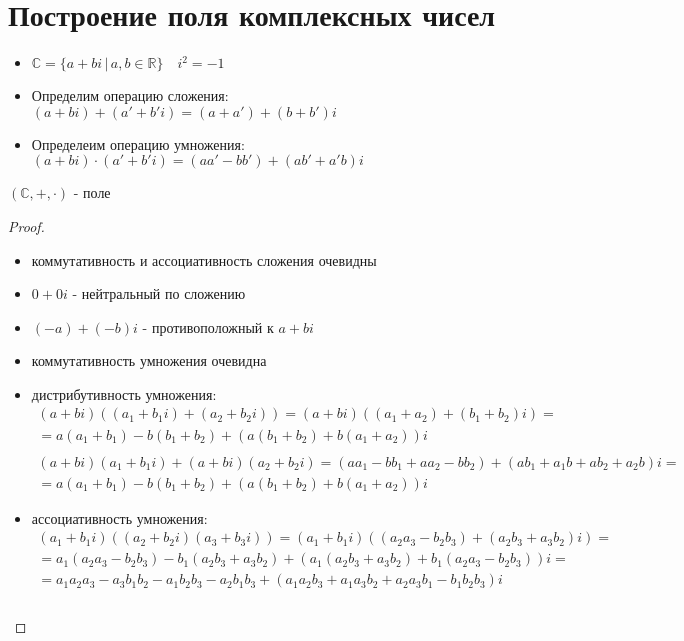 \section{Построение поля комплексных чисел}
\begin{itemize}
    \item $\mathbb{C} = \{a + bi\,|\, a, b \in \mathbb{R} \} \quad i^2 = -1$ 
    \item Определим операцию сложения: $(a + bi) + (a' + b'i) = (a + a') + (b + b')i$
    \item Определеим операцию умножения: $(a + bi) \cdot (a' + b'i) = (aa' - bb') + (ab' + a'b)i$ 
\end{itemize} 
\begin{theorem-non}
    $(\mathbb{C}, +, \cdot)$ - поле
\end{theorem-non}
\begin{proof} \quad \\
    \begin{itemize}
        \item коммутативность и ассоциативность сложения очевидны
        \item $0 + 0i$ - нейтральный по сложению
        \item $(-a) + (-b)i$ - противоположный к $a + bi$
        \item коммутативность умножения очевидна
        \item дистрибутивность умножения:
        \begin{gather*}
            (a + bi)((a_1 + b_1i) + (a_2 + b_2i)) = (a + bi)((a_1 + a_2) + (b_1 + b_2)i) = \\
            = a(a_1 + b_1) - b(b_1 + b_2) + (a(b_1 + b_2) + b(a_1 + a_2))i \\ \\
            (a + bi)(a_1 + b_1i) + (a + bi)(a_2 + b_2i) = (aa_1 - bb_1 + aa_2 - bb_2) + (ab_1 + a_1b + ab_2 + a_2b)i = \\
            = a(a_1 + b_1) - b(b_1 + b_2) + (a(b_1 + b_2) + b(a_1 + a_2))i
        \end{gather*}
        \item ассоциативность умножения:
        \begin{gather*}
            (a_1 + b_1i)((a_2 + b_2i)(a_3 + b_3i)) = (a_1 + b_1i)((a_2a_3 - b_2b_3) + (a_2b_3 + a_3b_2)i) = \\
            = a_1(a_2a_3 - b_2b_3) - b_1(a_2b_3 + a_3b_2) + (a_1(a_2b_3 + a_3b_2) + b_1(a_2a_3 - b_2b_3))i = \\
            = a_1a_2a_3 - a_3b_1b_2 - a_1b_2b_3 - a_2b_1b_3 + (a_1a_2b_3 + a_1a_3b_2 + a_2a_3b_1 - b_1b_2b_3)i  \\ \\

\end{gather*}
\end{itemize}
\end{proof}
